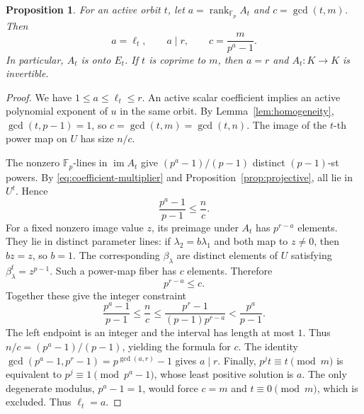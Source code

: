 \documentclass[11pt]{article}
\newtheorem{proposition}[theorem]{Proposition}
\theoremstyle{definition}
\theoremstyle{remark}
\newcommand{\Fp}{\mathbb F_p}
\newcommand{\rank}{\operatorname{rank}}
\numberwithin{equation}{section}
\begin{document}
\begin{proposition}\label{prop:rank}
For an active orbit \(t\), let \(a=\rank_{\Fp} A_t\) and
\(c=\gcd(t,m)\). Then
\begin{equation}\label{eq:rank-result}
 a=\ell_t,\qquad a\mid r,\qquad
 c=\frac{m}{p^a-1}.
\end{equation}
In particular, \(A_t\) is onto \(E_t\). If \(t\) is coprime to \(m\),
then \(a=r\) and \(A_t:K\to K\) is invertible.
\end{proposition}
\begin{proof}
We have \(1\le a\le\ell_t\le r\).
An active scalar coefficient implies an active polynomial exponent of
\(u\) in the same orbit. By Lemma~\ref{lem:homogeneity},
\(\gcd(t,p-1)=1\), so
\(c=\gcd(t,m)=\gcd(t,n)\).
The image of the \(t\)-th power map on \(U\) has size \(n/c\).

The nonzero \(\Fp\)-lines in \(\operatorname{im}A_t\) give
\((p^a-1)/(p-1)\) distinct \((p-1)\)-st powers.
By \eqref{eq:coefficient-multiplier} and
Proposition~\ref{prop:projective}, all lie in \(U^t\). Hence
\begin{equation}\label{eq:rank-ineq-one}
 \frac{p^a-1}{p-1}\le\frac nc.
\end{equation}
For a fixed nonzero image value \(z\), its preimage under \(A_t\)
has \(p^{r-a}\) elements. They lie in distinct parameter lines:
if \(\lambda_2=b\lambda_1\) and both map to \(z\ne0\), then
\(bz=z\), so \(b=1\). The corresponding \(\beta_\lambda\) are
distinct elements of \(U\) satisfying
\(\beta_\lambda^t=z^{p-1}\).
Such a power-map fiber has \(c\) elements. Therefore
\begin{equation}\label{eq:rank-ineq-two}
 p^{r-a}\le c.
\end{equation}
Together these give the integer constraint
\[
 \frac{p^a-1}{p-1}\le\frac nc
 \le\frac{p^r-1}{(p-1)p^{r-a}}<\frac{p^a}{p-1}.
\]
The left endpoint is an integer and the interval has length at most
\(1\). Thus \(n/c=(p^a-1)/(p-1)\), yielding the formula for \(c\).
The identity
\(\gcd(p^a-1,p^r-1)=p^{\gcd(a,r)}-1\) gives \(a\mid r\).
Finally, \(p^j t\equiv t\pmod m\) is equivalent to
\(p^j\equiv1\pmod{p^a-1}\), whose least positive solution is \(a\).
The only degenerate modulus, \(p^a-1=1\), would force \(c=m\)
and \(t\equiv0\pmod m\), which is excluded. Thus \(\ell_t=a\).
\end{proof}
\end{document}
